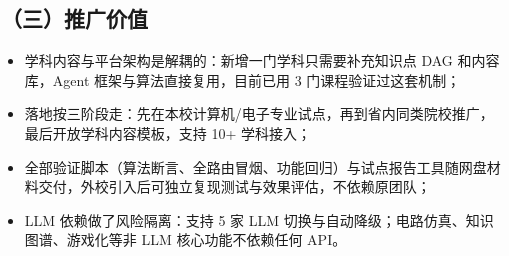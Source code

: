 \documentclass[zihao=-4,a4paper,UTF8,fontset=windows]{ctexart}
\begin{document}
\subsection{（三）推广价值}
\begin{itemize}[leftmargin=2em,itemsep=0pt,topsep=0pt]
\item 学科内容与平台架构是解耦的：新增一门学科只需要补充知识点 DAG 和内容库，Agent 框架与算法直接复用，目前已用 3 门课程验证过这套机制；
\end{itemize}
\begin{itemize}[leftmargin=2em,itemsep=0pt,topsep=0pt]
\item 落地按三阶段走：先在本校计算机/电子专业试点，再到省内同类院校推广，最后开放学科内容模板，支持 10+ 学科接入；
\end{itemize}
\begin{itemize}[leftmargin=2em,itemsep=0pt,topsep=0pt]
\item 全部验证脚本（算法断言、全路由冒烟、功能回归）与试点报告工具随网盘材料交付，外校引入后可独立复现测试与效果评估，不依赖原团队；
\end{itemize}
\begin{itemize}[leftmargin=2em,itemsep=0pt,topsep=0pt]
\item LLM 依赖做了风险隔离：支持 5 家 LLM 切换与自动降级；电路仿真、知识图谱、游戏化等非 LLM 核心功能不依赖任何 API。
\end{itemize}
\end{document}
